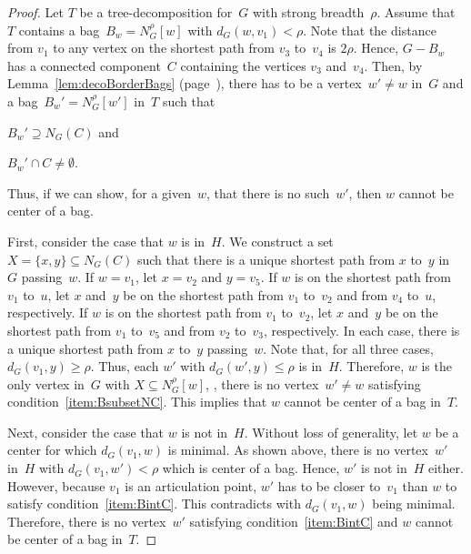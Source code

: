 \begin{proof}
Let $T$ be a tree-decomposition for~$G$ with strong breadth~$\rho$.
Assume that $T$ contains a bag~$B_w = N_G^\rho[w]$ with $d_G(w, v_1) < \rho$.
Note that the distance from $v_1$ to any vertex on the shortest path from $v_3$ to~$v_4$ is $2\rho$.
Hence, $G - B_w$ has a connected component~$C$ containing the vertices $v_3$ and~$v_4$.
Then, by Lemma~\ref{lem:decoBorderBags} (page~\pageref{lem:decoBorderBags}), there has to be a vertex~$w' \neq w$ in~$G$ and a bag~$B_w' = N_G^\rho[w']$ in~$T$ such that
\begin{enumerate*}[(i),mode=unboxed]
    \item
        \label{item:BsubsetNC}
        $B_w' \supseteq N_G(C)$ and
    \item
        \label{item:BintC}
        $B_w' \cap C \neq \emptyset$.
\end{enumerate*}
Thus, if we can show, for a given~$w$, that there is no such~$w'$, then $w$ cannot be center of a bag.

First, consider the case that $w$ is in~$H$.
We construct a set~$X =\{ x, y \} \subseteq N_G(C)$ such that there is a unique shortest path from $x$ to~$y$ in~$G$ passing~$w$.
If $w = v_1$, let $x = v_2$ and $y = v_5$.
If $w$ is on the shortest path from $v_1$ to~$u$, let $x$ and~$y$ be on the shortest path from $v_1$ to~$v_2$ and from $v_4$ to~$u$, respectively.
If $w$ is on the shortest path from $v_1$ to~$v_2$, let $x$ and~$y$ be on the shortest path from $v_1$ to~$v_5$ and from $v_2$ to~$v_3$, respectively.
In each case, there is a unique shortest path from $x$ to~$y$ passing~$w$.
Note that, for all three cases, $d_G(v_1, y) \geq \rho$.
Thus, each $w'$  with $d_G(w', y) \leq \rho$ is in~$H$.
Therefore, $w$ is the only vertex in~$G$ with $X \subseteq N_G^\rho[w]$, \ie, there is no vertex~$w' \neq w$ satisfying condition~\ref{item:BsubsetNC}.
This implies that $w$ cannot be center of a bag in~$T$.

Next, consider the case that $w$ is not in~$H$.
Without loss of generality, let $w$ be a center for which $d_G(v_1, w)$ is minimal.
As shown above, there is no vertex~$w'$ in~$H$ with $d_G(v_1, w') < \rho$ which is center of a bag.
Hence, $w'$ is not in~$H$ either.
However, because $v_1$ is an articulation point, $w'$ has to be closer to~$v_1$ than $w$ to satisfy condition~\ref{item:BintC}.
This contradicts with $d_G(v_1, w)$ being minimal.
Therefore, there is no vertex~$w'$ satisfying condition~\ref{item:BintC} and $w$ cannot be center of a bag in~$T$.
\end{proof}



